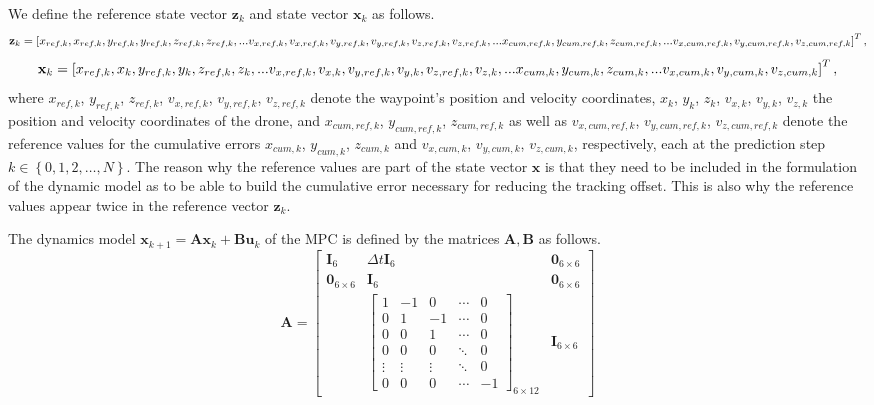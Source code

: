 We define the reference state vector $\mathbf{z}_k$ and state vector $\mathbf{x}_k$ as follows.
\begin{dmath}
\mathbf{z}_k = \left[x_{ref,k},  x_{ref,k},  y_{ref,k},  y_{ref,k},  z_{ref,k},  z_{ref,k},...\\ v_{x,ref,k},v_{x,ref,k}, v_{y,ref,k}, v_{y,ref,k},  v_{z,ref,k},v_{z,ref,k},...  \\x_{cum,ref,k},  y_{cum,ref,k},  z_{cum,ref,k},...\\ v_{x,cum,ref,k},  v_{y,cum,ref,k}, v_{z,cum,ref,k}\right]^T,
\end{dmath}
\begin{dmath}
\mathbf{x}_k = \left[x_{ref,k},  x_k,  y_{ref,k},  y_k,  z_{ref,k},  z_k,...\\ v_{x,ref,k},v_{x,k}, v_{y,ref,k}, v_{y,k},  v_{z,ref,k},v_{z,k},...  \\x_{cum,k},  y_{cum,k},  z_{cum,k},...\\ v_{x,cum,k},  v_{y,cum,k}, v_{z,cum,k}\right]^T,
\end{dmath}
where $x_{ref,k}$, $y_{ref,k}$, $z_{ref,k}$, $v_{x,ref,k}$, $v_{y,ref,k}$, $v_{z,ref,k}$ denote the waypoint's position and velocity coordinates, $x_k$, $y_k$, $z_k$, $v_{x,k}$, $v_{y,k}$, $v_{z,k}$ the position and velocity coordinates of the drone, and $x_{cum,ref,k}$, $ y_{cum,ref,k}$, $ z_{cum,ref,k}$ as well as $v_{x,cum,ref,k}$, $ v_{y,cum,ref,k}$, $v_{z,cum,ref,k}$ denote the reference values for the cumulative errors $x_{cum,k}$, $y_{cum,k}$, $z_{cum,k}$ and $v_{x,cum,k}$, $v_{y,cum,k}$, $v_{z,cum,k}$, respectively, each at the prediction step $k \in \left\lbrace 0,1,2,\ldots,N \right\rbrace$.
The reason why the reference values are part of the state vector $\mathbf{x}$  is that they need to be included in the formulation of the dynamic model as to be able to build the cumulative error necessary for reducing the tracking offset. This is also why the reference values appear twice in the reference vector $\mathbf{z}_k$.

 
The dynamics model $\mathbf{x}_{k+1} = \mathbf{A} \mathbf{x}_k + \mathbf{B} \mathbf{u}_k $ of the MPC is defined by the matrices $\mathbf{A},\mathbf{B}$ as follows.
\begin{equation}
\mathbf{A} =
\begin{bmatrix}
    \mathbf{I}_6 & \Delta t \mathbf{I}_6 & \mathbf{0}_{6 \times 6} \\
    \mathbf{0}_{6 \times 6} & \mathbf{I}_6 & \mathbf{0}_{6 \times 6} \\
	 &	\begin{bmatrix}
		1 & -1 & 0 & \cdots & 0 \\
		0 & 1 & -1 & \cdots & 0 \\
		0 & 0 & 1 & \cdots & 0 \\
		0 & 0 & 0 & \ddots & 0 \\
		\vdots & \vdots & \vdots & \ddots & 0 \\
		0 & 0 & 0 & \cdots & -1 
	\end{bmatrix}_{6\times 12} & \mathbf{I}_{6 \times 6}
\end{bmatrix}
\end{equation}

